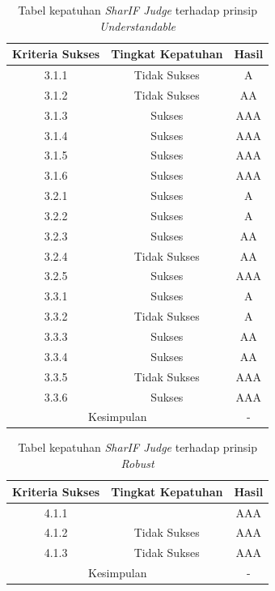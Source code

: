 \documentclass[a4paper,twoside]{article}
\begin{document}
\begin{enumerate}
		\begin{table}[H]
			\centering
			\caption{Tabel kepatuhan \textit{SharIF Judge} terhadap prinsip \textit{Understandable}}
			\label{tab:kepatuhan_sharif_judge_understandable}
			\begin{tabular}{|c|c|c|}
				\hline
				Kriteria Sukses & Tingkat Kepatuhan & Hasil \\
				\hline
				3.1.1 & Tidak Sukses & A\\
				3.1.2 & Tidak Sukses & AA\\
				3.1.3 & Sukses & AAA\\
				3.1.4 & Sukses & AAA\\
				3.1.5 & Sukses & AAA\\
				3.1.6 & Sukses & AAA\\
				3.2.1 & Sukses & A\\
				3.2.2 & Sukses & A\\
				3.2.3 & Sukses & AA\\
				3.2.4 & Tidak Sukses & AA\\
				3.2.5 & Sukses & AAA\\
				3.3.1 & Sukses & A\\
				3.3.2 & Tidak Sukses & A\\
				3.3.3 & Sukses & AA\\
				3.3.4 & Sukses & AA\\
				3.3.5 & Tidak Sukses & AAA\\
				3.3.6 & Sukses & AAA\\
				\hline
				\multicolumn{2}{|c|}{Kesimpulan} & - \\
				\hline
			\end{tabular}
		\end{table}
		
		\begin{table}[H]
			\centering
			\caption{Tabel kepatuhan \textit{SharIF Judge} terhadap prinsip \textit{Robust}}
			\label{tab:kepatuhan_sharif_judge_robust}
			\begin{tabular}{|c|c|c|}
				\hline
				Kriteria Sukses & Tingkat Kepatuhan & Hasil \\
				\hline
				4.1.1 &  & AAA\\
				4.1.2 & Tidak Sukses & AAA\\
				4.1.3 & Tidak Sukses & AAA\\
				\hline
				\multicolumn{2}{|c|}{Kesimpulan} & - \\
				\hline
			\end{tabular}
		\end{table}
		

\end{enumerate}
\end{document}
